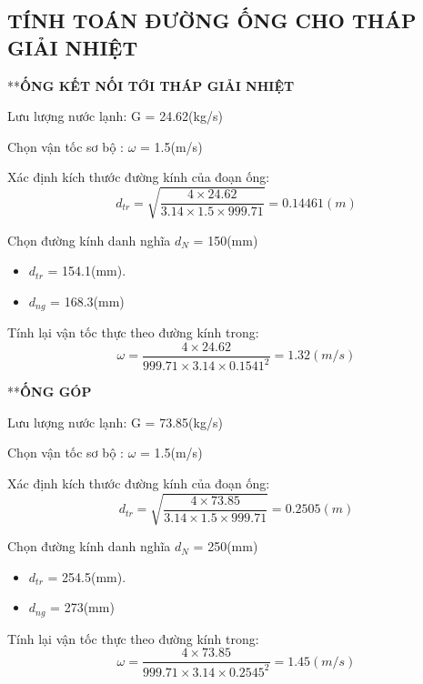 \subsection{TÍNH TOÁN ĐƯỜNG ỐNG CHO THÁP GIẢI NHIỆT}

**\textbf{ỐNG KẾT NỐI TỚI THÁP GIẢI NHIỆT}

Lưu lượng nước lạnh: G = 24.62(kg/s)

Chọn vận tốc sơ bộ : $\omega$ = 1.5(m/s)

Xác định kích thước đường kính của đoạn ống:
\begin{equation*}
	d_{tr} = \sqrt{\dfrac{4 \times 24.62}{3.14 \times 1.5 \times 999.71}} =0.14461 (m)
\end{equation*}

Chọn đường kính danh nghĩa $d_{N}$ = 150(mm)
\begin{itemize}
	\item $d_{tr}$ = 154.1(mm).
	\item $d_{ng}$ = 168.3(mm)
\end{itemize}

Tính lại vận tốc thực theo đường kính trong:
\begin{equation*}
	\omega = \dfrac{4 \times 24.62 }{999.71 \times 3.14 \times 0.1541^{2}} = 1.32(m/s)
\end{equation*}

**\textbf{ỐNG GÓP}

Lưu lượng nước lạnh: G = 73.85(kg/s)

Chọn vận tốc sơ bộ : $\omega$ = 1.5(m/s)

Xác định kích thước đường kính của đoạn ống:
\begin{equation*}
	d_{tr} = \sqrt{\dfrac{4 \times 73.85}{3.14 \times 1.5 \times 999.71}} =0.2505 (m)
\end{equation*}

Chọn đường kính danh nghĩa $d_{N}$ = 250(mm)
\begin{itemize}
	\item $d_{tr}$ = 254.5(mm).
	\item $d_{ng}$ = 273(mm)
\end{itemize}

Tính lại vận tốc thực theo đường kính trong:
\begin{equation*}
	\omega = \dfrac{4 \times 73.85 }{999.71 \times 3.14 \times 0.2545^{2}} = 1.45(m/s)
\end{equation*}